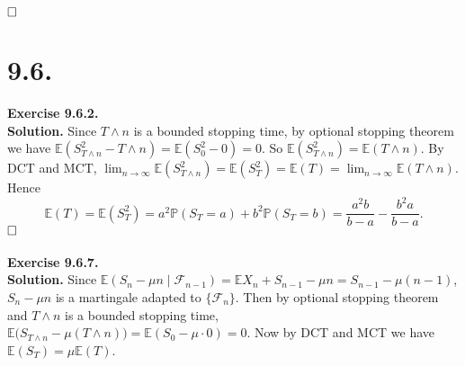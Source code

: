 \documentclass[12pt]{extarticle}
\begin{document}
$\hspace{\fill}\square$

\section*{9.6.}
\textbf{Exercise 9.6.2.}\\
\textbf{Solution.} Since $T\wedge n$ is a bounded stopping time, by optional stopping theorem we have $\mathbb{E}(S_{T\wedge n}^2-T\wedge n)=\mathbb{E}(S_0^2-0)=0$. So $\mathbb{E}(S_{T\wedge n}^2)=\mathbb{E}(T\wedge n)$. By DCT and MCT, $\lim_{n\rightarrow\infty}\mathbb{E}(S_{T\wedge n}^2)=\mathbb{E}(S_T^2)=\mathbb{E}(T)=\lim_{n\rightarrow\infty}\mathbb{E}(T\wedge n)$. Hence
\begin{equation*}
\mathbb{E}(T)=\mathbb{E}(S_T^2)=a^2\mathbb{P}(S_T=a)+b^2\mathbb{P}(S_T=b)=\frac{a^2b}{b-a}-\frac{b^2a}{b-a}.
\end{equation*}
$\hspace{\fill}\square$ \\ \\
\textbf{Exercise 9.6.7.}\\
\textbf{Solution.} Since $\mathbb{E}(S_n-\mu n\mid\mathcal{F}_{n-1})=\mathbb{E}X_n+S_{n-1}-\mu n=S_{n-1}-\mu(n-1)$, $S_n-\mu n$ is a martingale adapted to $\{\mathcal{F}_n\}$. Then by optional stopping theorem and $T\wedge n$ is a bounded stopping time, $\mathbb{E}\big(S_{T\wedge n}-\mu( T\wedge n)\big)=\mathbb{E}(S_0-\mu\cdot 0)=0$. Now by DCT and MCT we have $\mathbb{E}(S_T)=\mu\mathbb{E}(T)$. \\ \\
\end{document}
